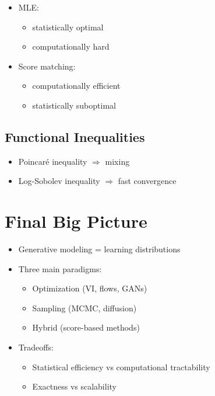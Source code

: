 \documentclass[12pt,oneside]{book}
\numberwithin{equation}{section}
\theoremstyle{definition}
\theoremstyle{plain}
\theoremstyle{remark}
\begin{document}
\begin{itemize}
    \item MLE:
    \begin{itemize}
        \item statistically optimal
        \item computationally hard
    \end{itemize}
    \item Score matching:
    \begin{itemize}
        \item computationally efficient
        \item statistically suboptimal
    \end{itemize}
\end{itemize}

\subsection{Functional Inequalities}

\begin{itemize}
    \item Poincaré inequality $\Rightarrow$ mixing
    \item Log-Sobolev inequality $\Rightarrow$ fast convergence
\end{itemize}

\section{Final Big Picture}

\begin{itemize}
    \item Generative modeling = learning distributions
    \item Three main paradigms:
    \begin{itemize}
        \item Optimization (VI, flows, GANs)
        \item Sampling (MCMC, diffusion)
        \item Hybrid (score-based methods)
    \end{itemize}
    \item Tradeoffs:
    \begin{itemize}
        \item Statistical efficiency vs computational tractability
        \item Exactness vs scalability
    \end{itemize}
\end{itemize}
\end{document}
